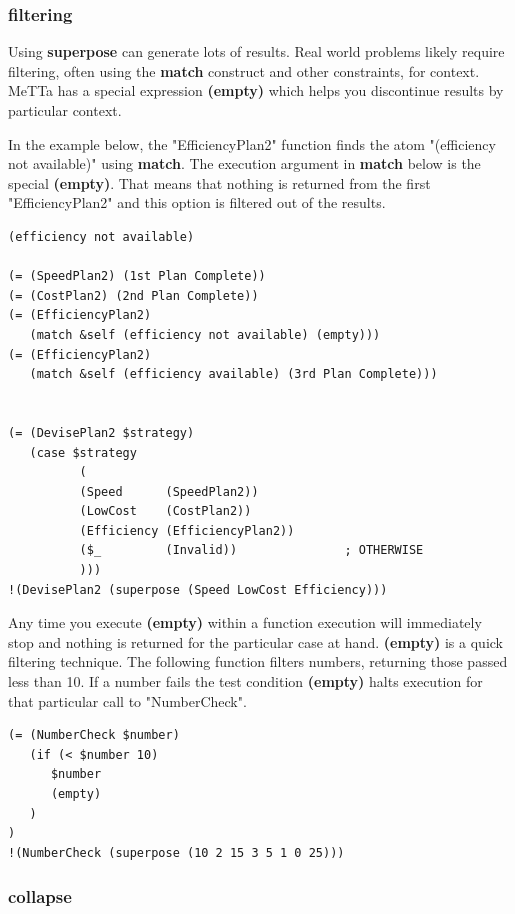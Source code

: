 \documentclass{article}
\begin{document}
\subsubsection{filtering}

Using \textbf{superpose} can generate lots of results. Real world problems likely require filtering, often using the \textbf{match} construct and other constraints, for context. MeTTa has a special expression \textbf{(empty)} which helps you discontinue results by particular context. 

In the example below, the "EfficiencyPlan2" function finds the atom "(efficiency not available)" using \textbf{match}. The execution argument in \textbf{match} below is the special \textbf{(empty)}. That means that nothing is returned from the first "EfficiencyPlan2" and this option is filtered out of the results. 

\begin{verbatim}
(efficiency not available)      

(= (SpeedPlan2) (1st Plan Complete))
(= (CostPlan2) (2nd Plan Complete))
(= (EfficiencyPlan2) 
   (match &self (efficiency not available) (empty)))
(= (EfficiencyPlan2) 
   (match &self (efficiency available) (3rd Plan Complete)))


(= (DevisePlan2 $strategy)
   (case $strategy
          (
          (Speed      (SpeedPlan2))      
          (LowCost    (CostPlan2))       
          (Efficiency (EfficiencyPlan2)) 
          ($_         (Invalid))               ; OTHERWISE
          )))
!(DevisePlan2 (superpose (Speed LowCost Efficiency)))
\end{verbatim}

Any time you execute \textbf{(empty)} within a function execution will immediately stop and nothing is returned for the particular case at hand. \textbf{(empty)} is a quick filtering technique. The following function filters numbers, returning those passed less than 10. If a number fails the test condition \textbf{(empty)} halts execution for that particular call to "NumberCheck".

\begin{verbatim}
(= (NumberCheck $number)
   (if (< $number 10)
      $number
      (empty)
   )
)
!(NumberCheck (superpose (10 2 15 3 5 1 0 25)))
\end{verbatim}


\subsubsection{collapse}
\end{document}
